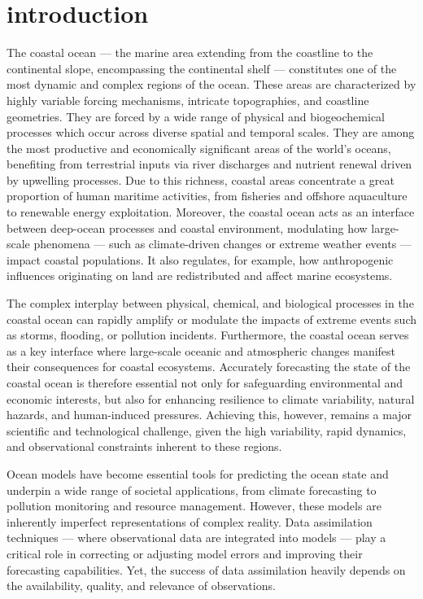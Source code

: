 \section{introduction}


The coastal ocean — the marine area extending from the coastline to the
continental slope, encompassing the continental shelf — constitutes one
of the most dynamic and complex regions of the ocean. These areas are
characterized by highly variable forcing mechanisms, intricate
topographies, and coastline geometries. They are forced by a wide range
of physical and biogeochemical processes which occur across diverse
spatial and temporal scales. They are among the most productive and
economically significant areas of the world’s oceans, benefiting from
terrestrial inputs via river discharges and nutrient renewal driven by
upwelling processes. Due to this richness, coastal areas concentrate a
great proportion of human maritime activities, from fisheries and
offshore aquaculture to renewable energy exploitation. Moreover, the
coastal ocean acts as an interface between deep-ocean processes and
coastal environment, modulating how large-scale phenomena — such as
climate-driven changes or extreme weather events — impact coastal
populations. It also regulates, for example, how anthropogenic
influences originating on land are redistributed and affect marine
ecosystems.

The complex interplay between physical, chemical, and biological
processes in the coastal ocean can rapidly amplify or modulate the
impacts of extreme events such as storms, flooding, or pollution
incidents. Furthermore, the coastal ocean serves as a key interface
where large-scale oceanic and atmospheric changes manifest their
consequences for coastal ecosystems. Accurately forecasting the state of
the coastal ocean is therefore essential not only for safeguarding
environmental and economic interests, but also for enhancing resilience
to climate variability, natural hazards, and human-induced pressures.
Achieving this, however, remains a major scientific and technological
challenge, given the high variability, rapid dynamics, and observational
constraints inherent to these regions.

Ocean models have become essential tools for predicting the ocean state
and underpin a wide range of societal applications, from climate
forecasting to pollution monitoring and resource management. However,
these models are inherently imperfect representations of complex
reality. Data assimilation techniques — where observational data are
integrated into models — play a critical role in correcting or adjusting
model errors and improving their forecasting capabilities. Yet, the
success of data assimilation heavily depends on the availability,
quality, and relevance of observations.

